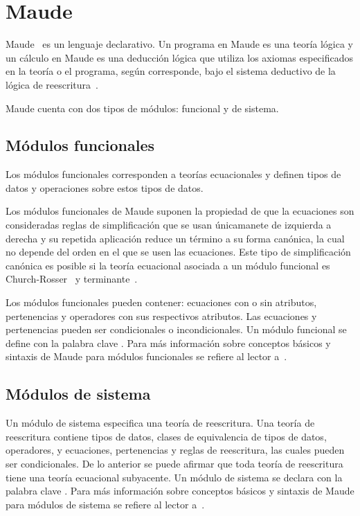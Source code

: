  
\section{Maude}
\label{m.prelim}

Maude~\cite{maude-book} es un lenguaje declarativo. Un programa en Maude
es una teoría lógica y un cálculo en Maude es una deducción lógica que
utiliza los axiomas especificados en la teoría o el programa, según
corresponde, bajo el sistema deductivo de la lógica de reescritura~\cite{Meseguer199273}.

Maude cuenta con dos tipos de módulos: funcional y de sistema.

 \subsection{Módulos funcionales}
 \label{mf.prelim}

 Los módulos funcionales corresponden a teorías ecuacionales y definen
 tipos de datos y operaciones sobre estos tipos de datos.

 Los módulos funcionales de Maude suponen la propiedad de que la
 ecuaciones son consideradas reglas de simplificación que se usan
 únicamanete de izquierda a derecha y su repetida aplicación reduce un
 término a su forma canónica, la cual no depende del orden en el que se
 usen las ecuaciones. Este tipo de simplificación canónica es posible si
 la teoría ecuacional asociada a un módulo funcional es
 Church-Rosser~\cite{DBLP:journals/jlp/DuranM12} y terminante~\cite{Lucas2009207}.

 Los módulos funcionales pueden contener: ecuaciones con o sin atributos,
 pertenencias y operadores con sus respectivos atributos. Las ecuaciones
 y pertenencias pueden ser condicionales o incondicionales. Un módulo
 funcional se define con la palabra clave . Para más información
 sobre conceptos básicos y sintaxis de Maude para módulos funcionales se
 refiere al lector a~\cite{maude-book}.

 \subsection{Módulos de sistema}
 \label{ms.prelim}

 Un módulo de sistema especifica una teoría de reescritura. Una teoría de
 reescritura contiene tipos de datos, clases de equivalencia de
 tipos de datos, operadores, y ecuaciones, pertenencias y reglas de
 reescritura, las cuales pueden ser condicionales. De lo anterior se
 puede afirmar que toda teoría de reescritura tiene una teoría ecuacional
 subyacente. Un módulo de sistema se declara con la palabra clave
 . Para más información sobre conceptos básicos y sintaxis de
 Maude para módulos de sistema se refiere al lector a~\cite{maude-book}.

